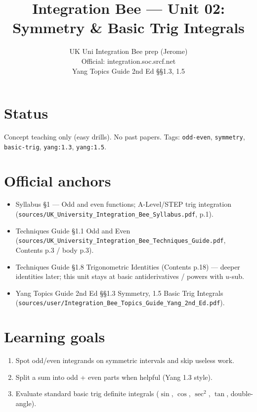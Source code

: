 
\title{Integration Bee --- Unit 02:\\ Symmetry \& Basic Trig Integrals}
\author{UK Uni Integration Bee prep (Jerome)\\ Official: integration.soc.srcf.net\\ Yang Topics Guide 2nd Ed §§1.3, 1.5}
\date{}

\maketitle

\section*{Status}
Concept teaching only (easy drills). No past papers.
Tags: \texttt{odd-even}, \texttt{symmetry}, \texttt{basic-trig}, \texttt{yang:1.3}, \texttt{yang:1.5}.

\section{Official anchors}
\begin{itemize}
  \item Syllabus §1 --- Odd and even functions; A-Level/STEP trig integration
        (\texttt{sources/UK\_University\_Integration\_Bee\_Syllabus.pdf}, p.1).
  \item Techniques Guide §1.1 Odd and Even
        (\texttt{sources/UK\_University\_Integration\_Bee\_Techniques\_Guide.pdf}, Contents p.3 / body p.3).
  \item Techniques Guide §1.8 Trigonometric Identities (Contents p.18) --- deeper identities later;
        this unit stays at basic antiderivatives / powers with $u$-sub.
  \item Yang Topics Guide 2nd Ed §§1.3 Symmetry, 1.5 Basic Trig Integrals
        (\texttt{sources/user/Integration\_Bee\_Topics\_Guide\_Yang\_2nd\_Ed.pdf}).
\end{itemize}

\section{Learning goals}
\begin{enumerate}
  \item Spot odd/even integrands on symmetric intervals and skip useless work.
  \item Split a sum into odd + even parts when helpful (Yang 1.3 style).
  \item Evaluate standard basic trig definite integrals ($\sin$, $\cos$, $\sec^2$, $\tan$, double-angle).
\end{enumerate}

